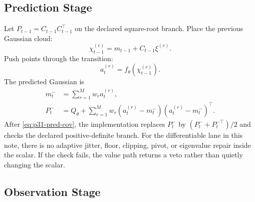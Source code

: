 \documentclass[11pt]{article}
\numberwithin{equation}{section}
\begin{document}
\subsection{Prediction Stage}

Let \(P_{t-1}=C_{t-1}C_{t-1}^\top\) on the declared square-root branch.  Place
the previous Gaussian cloud:
\begin{equation}
  \chi_{t-1}^{(r)}
  =
  m_{t-1}+C_{t-1}\xi^{(r)}.
  \label{eq:p31-pred-placed-points}
\end{equation}
Push points through the transition:
\begin{equation}
  a_t^{(r)}=f_\theta(\chi_{t-1}^{(r)}).
  \label{eq:p31-transition-points}
\end{equation}
The predicted Gaussian is
\begin{align}
  m_t^-&=\sum_{r=1}^Mw_ra_t^{(r)},
  \label{eq:p31-pred-mean}\\
  P_t^-&=Q_\theta+\sum_{r=1}^Mw_r
  (a_t^{(r)}-m_t^-)(a_t^{(r)}-m_t^-)^\top.
  \label{eq:p31-pred-cov}
\end{align}
After \eqref{eq:p31-pred-cov}, the implementation replaces \(P_t^-\) by
\((P_t^-+P_t^{-\top})/2\) and checks the declared positive-definite branch.
For the differentiable lane in this note, there is no adaptive jitter, floor,
clipping, pivot, or eigenvalue repair inside the scalar.  If the check fails,
the value path returns a veto rather than quietly changing the scalar.

\subsection{Observation Stage}
\end{document}
